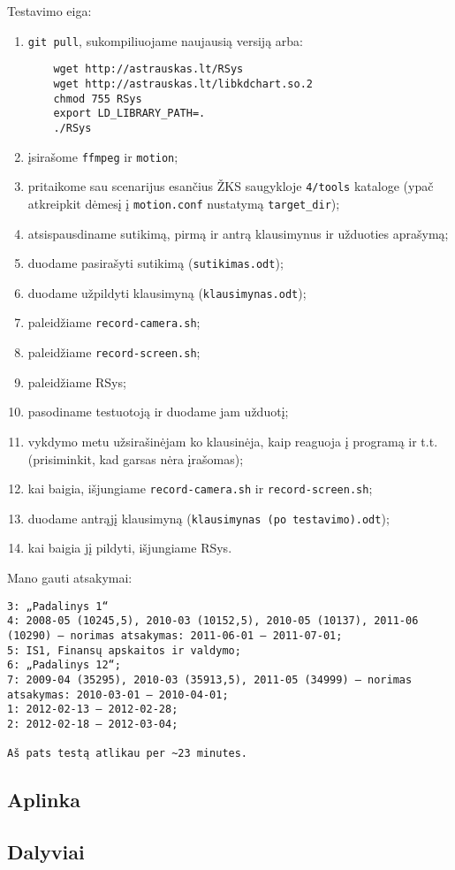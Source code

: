 Testavimo eiga:
\begin{enumerate}
  \item \verb|git pull|, sukompiliuojame naujausią versiją arba:
    \begin{verbatim}
    wget http://astrauskas.lt/RSys
    wget http://astrauskas.lt/libkdchart.so.2
    chmod 755 RSys
    export LD_LIBRARY_PATH=.
    ./RSys
    \end{verbatim}
  \item įsirašome \verb|ffmpeg| ir \verb|motion|;
  \item pritaikome sau scenarijus esančius ŽKS saugykloje
    \verb|4/tools| kataloge (ypač atkreipkit dėmesį į \verb|motion.conf|
    nustatymą \verb|target_dir|);
  \item atsispausdiname sutikimą, pirmą ir antrą klausimynus ir užduoties
    aprašymą;
  \item duodame pasirašyti sutikimą (\verb|sutikimas.odt|);
  \item duodame užpildyti klausimyną (\verb|klausimynas.odt|);
  \item paleidžiame \verb|record-camera.sh|;
  \item paleidžiame \verb|record-screen.sh|;
  \item paleidžiame RSys;
  \item pasodiname testuotoją ir duodame jam užduotį;
  \item vykdymo metu užsirašinėjam ko klausinėja, kaip reaguoja į programą
    ir t.t. (prisiminkit, kad garsas nėra įrašomas);
  \item kai baigia, išjungiame \verb|record-camera.sh| ir
    \verb|record-screen.sh|;
  \item duodame antrąjį klausimyną (\verb|klausimynas (po testavimo).odt|);
  \item kai baigia jį pildyti, išjungiame RSys.
\end{enumerate}

Mano gauti atsakymai:
\begin{verbatim}
3: „Padalinys 1“
4: 2008-05 (10245,5), 2010-03 (10152,5), 2010-05 (10137), 2011-06 (10290) – norimas atsakymas: 2011-06-01 – 2011-07-01;
5: IS1, Finansų apskaitos ir valdymo;
6: „Padalinys 12“;
7: 2009-04 (35295), 2010-03 (35913,5), 2011-05 (34999) – norimas atsakymas: 2010-03-01 – 2010-04-01;
1: 2012-02-13 – 2012-02-28;
2: 2012-02-18 – 2012-03-04;

Aš pats testą atlikau per ~23 minutes.

\end{verbatim}

\subsection{Aplinka}

\subsection{Dalyviai}
